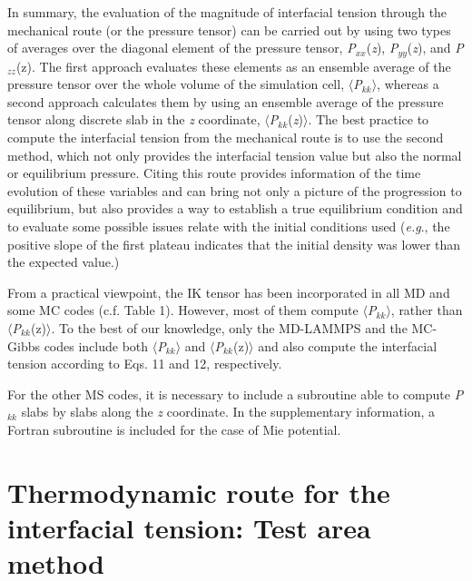 \documentclass{scrbook}
\begin{document}
In summary, the evaluation of the magnitude of interfacial tension through the
mechanical route (or the pressure tensor) can be carried out by using two types
of averages over the diagonal element of the pressure tensor,
\textit{P}$_{xx}$(\textit{z}), \textit{P}$_{yy}$(\textit{z}), and
\textit{P}$_{zz}$(z). The first approach evaluates these elements as an
ensemble average of the pressure tensor over the whole volume of the simulation
cell, ${\langle}$\textit{P}$_{kk}$${\rangle}$, whereas a second approach
calculates them by using an ensemble average of the pressure tensor along
discrete slab in the \textit{z} coordinate,
${\langle}$\textit{P}$_{kk}$(\textit{z})${\rangle}$. The best practice to
compute the interfacial tension from the mechanical route is to use the second
method, which not only provides the interfacial tension value but also the
normal or equilibrium pressure. Citing \citet{holcomb1993} this route provides information of the time
evolution of these variables and can bring not only a picture of the
progression to equilibrium,  but also provides a way to establish a true
equilibrium condition and to evaluate some possible issues relate with the
initial conditions used (\textit{e.g}., the positive slope of the first plateau
indicates that the initial density was lower than the expected value.) 

From a practical viewpoint, the IK tensor has been incorporated in all MD and
some MC codes (c.f. Table 1). However, most of them compute
${\langle}$\textit{P}$_{kk}$${\rangle}$, rather than
${\langle}$\textit{P}$_{kk}$(z)${\rangle}$. To the best of our knowledge, only
the MD-LAMMPS and the MC-Gibbs codes include both
${\langle}$\textit{P}$_{kk}$${\rangle}$ and
${\langle}$\textit{P}$_{kk}$(z)${\rangle}$ and also compute the interfacial
tension according to Eqs. 11 and 12, respectively.

For the other MS codes, it is necessary to include a subroutine able to compute
\textit{P}$_{kk}$ slabs by slabs along the \textit{z} coordinate. In the
supplementary information, a Fortran subroutine is included for the case of Mie
potential. 

\section{Thermodynamic route for the interfacial tension: Test area method}
\end{document}
